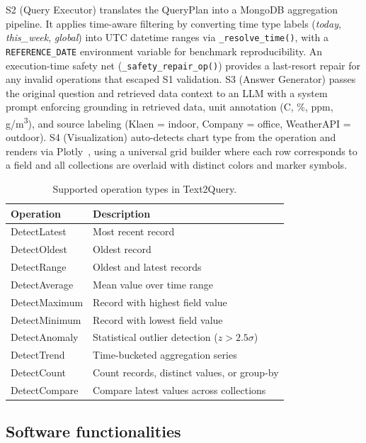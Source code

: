\documentclass[preprint,12pt,a4paper]{elsarticle}
\begin{document}
S2 (Query Executor) translates the QueryPlan into a MongoDB aggregation pipeline. It applies time-aware filtering by converting time type labels (\emph{today}, \emph{this\_week}, \emph{global}) into UTC datetime ranges via \texttt{\_resolve\_time()}, with a \texttt{REFERENCE\_DATE} environment variable for benchmark reproducibility. An execution-time safety net (\texttt{\_safety\_repair\_op()}) provides a last-resort repair for any invalid operations that escaped S1 validation. S3 (Answer Generator) passes the original question and retrieved data context to an LLM with a system prompt enforcing grounding in retrieved data, unit annotation (\textdegree C, \%, ppm, \textmu g/m\textsuperscript{3}), and source labeling (Klaen = indoor, Company = office, WeatherAPI = outdoor). S4 (Visualization) auto-detects chart type from the operation and renders via Plotly~\cite{plotly}, using a universal grid builder where each row corresponds to a field and all collections are overlaid with distinct colors and marker symbols.

\begin{table}[H]
\centering
\caption{Supported operation types in Text2Query.}
\label{tab:operations}
\begin{tabular}{ll}
\toprule
\textbf{Operation} & \textbf{Description} \\
\midrule
DetectLatest & Most recent record \\
DetectOldest & Oldest record \\
DetectRange & Oldest and latest records \\
DetectAverage & Mean value over time range \\
DetectMaximum & Record with highest field value \\
DetectMinimum & Record with lowest field value \\
DetectAnomaly & Statistical outlier detection ($z > 2.5\sigma$) \\
DetectTrend & Time-bucketed aggregation series \\
DetectCount & Count records, distinct values, or group-by \\
DetectCompare & Compare latest values across collections \\
\bottomrule
\end{tabular}
\end{table}

\subsection{Software functionalities}
\end{document}
